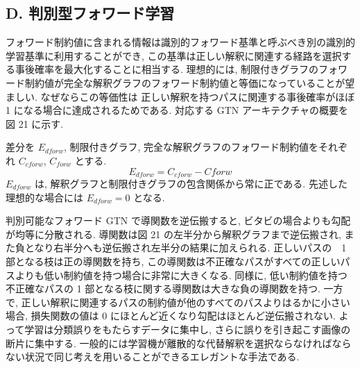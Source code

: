 \documentclass[twocolumn]{jarticle}     %
\begin{document}
\subsection*{D. 判別型フォワード学習}
フォワード制約値に含まれる情報は識別的フォワード基準と呼ぶべき別の識別的学習基準に利用することができ, この基準は正しい解釈に関連する経路を選択する事後確率を最大化することに相当する. 理想的には, 制限付きグラフのフォワード制約値が完全な解釈グラフのフォワード制約値と等価になっていることが望ましい. なぜならこの等価性は 正しい解釈を持つパスに関連する事後確率がほぼ 1 になる場合に達成されるためである.
対応する GTN アーキテクチャの概要を図 21 に示す.
\par 
差分を $E_{dforw}$, 制限付きグラフ, 完全な解釈グラフのフォワード制約値をそれぞれ $C_{cforw}$, $C_{forw}$ とする. 
\begin{equation}
  E_{dforw} = C_{cforw} - C{forw}
\end{equation}
$E_{dforw}$ は, 解釈グラフと制限付きグラフの包含関係から常に正である. 先述した理想的な場合には $E_{dforw} = 0$ となる.
\par
判別可能なフォワード GTN で導関数を逆伝搬すると, ビタビの場合よりも勾配が均等に分散される. 導関数は図 21 の左半分から解釈グラフまで逆伝搬され, また負となり右半分へも逆伝搬され左半分の結果に加えられる. 正しいパスの　1 部となる枝は正の導関数を持ち, この導関数は不正確なパスがすべての正しいパスよりも低い制約値を持つ場合に非常に大きくなる. 同様に, 低い制約値を持つ不正確なパスの 1 部となる枝に関する導関数は大きな負の導関数を持つ. 一方で, 正しい解釈に関連するパスの制約値が他のすべてのパスよりはるかに小さい場合, 損失関数の値は 0 にほとんど近くなり勾配はほとんど逆伝搬されない. よって学習は分類誤りをもたらすデータに集中し, さらに誤りを引き起こす画像の断片に集中する.
一般的には学習機が離散的な代替解釈を選択ならなければならない状況で同じ考えを用いることができるエレガントな手法である.
\end{document}
